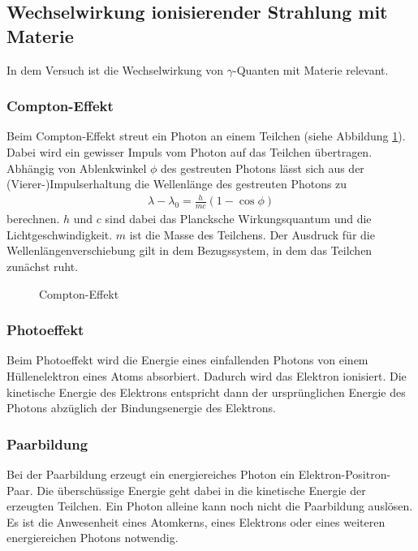 \subsection{Wechselwirkung ionisierender Strahlung mit Materie}
In dem Versuch ist die Wechselwirkung von $\gamma$-Quanten mit Materie relevant.
\subsubsection{Compton-Effekt} 
Beim Compton-Effekt streut ein Photon an einem Teilchen (siehe Abbildung \ref{fig:compton}). Dabei wird ein gewisser Impuls vom Photon auf das Teilchen übertragen. Abhängig von Ablenkwinkel $\phi$ des gestreuten Photons lässt sich aus der (Vierer-)Impulserhaltung die Wellenlänge des gestreuten Photons zu
\begin{align*}
  \lambda-\lambda_0=\frac{h}{mc}(1-\cos \phi)
\end{align*} 
berechnen. $h$ und $c$ sind dabei das Plancksche Wirkungsquantum und die Lichtgeschwindigkeit. $m$ ist die Masse des Teilchens. Der Ausdruck für die Wellenlängenverschiebung gilt in dem Bezugssystem, in dem das Teilchen zunächst ruht.
\begin{figure}[h]
  \centering
  \caption{Compton-Effekt}
  \label{fig:compton}
\end{figure}

\subsubsection{Photoeffekt}
Beim Photoeffekt wird die Energie eines einfallenden Photons von einem Hüllenelektron eines Atoms absorbiert. Dadurch wird das Elektron ionisiert. Die kinetische Energie des Elektrons entspricht dann der ursprünglichen Energie des Photons abzüglich der Bindungsenergie des Elektrons.

\subsubsection{Paarbildung}
Bei der Paarbildung erzeugt ein energiereiches Photon ein Elektron-Positron-Paar. Die überschüssige Energie geht dabei in die kinetische Energie der erzeugten Teilchen. Ein Photon alleine kann noch nicht die Paarbildung auslösen. Es ist die Anwesenheit eines Atomkerns, eines Elektrons oder eines weiteren energiereichen Photons notwendig. 

